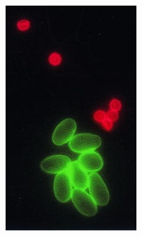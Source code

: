 \documentclass[aspectratio=169]{beamer}
\begin{document}
\begin{frame}
\begin{columns}
    \begin{column}{0.25\textwidth}
      \begin{figure}
        \vspace{-1.2em}
        \includegraphics[width=\textwidth, height=0.4\textheight]{figures/devices/contrast.jpg}
      \end{figure}
    \end{column}


\end{columns}
\end{frame}
\end{document}
